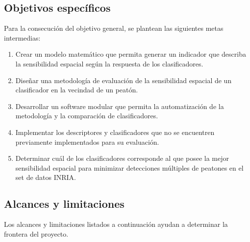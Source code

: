 \subsection{Objetivos específicos}

Para la consecución del objetivo general, se plantean las siguientes metas intermedias:

\begin{enumerate}
\item Crear un modelo matemático que permita generar un indicador que describa la sensibilidad espacial según la respuesta de los clasificadores.
\item Diseñar una metodología de evaluación de la sensibilidad espacial de un clasificador en la vecindad de un peatón.
\item Desarrollar un software modular que permita la automatización de la metodología y la comparación de clasificadores.
\item Implementar los descriptores y clasificadores que no se encuentren previamente implementados para su evaluación.
\item Determinar cuál de los clasificadores corresponde al que posee la mejor sensibilidad espacial para minimizar detecciones múltiples de peatones en el set de datos INRIA.


\end{enumerate}

\subsection{Alcances y limitaciones}

Los alcances y limitaciones listados a continuación ayudan a determinar la frontera del proyecto. 

